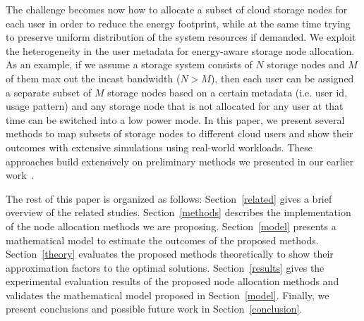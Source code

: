 The challenge becomes now how to allocate a subset of cloud storage nodes for each user in order to reduce 
the energy footprint, while at the same time trying to preserve uniform distribution of the system resources if
demanded. We exploit the heterogeneity in the user metadata for energy-aware storage node allocation. As an
example, if we assume a storage system consists of $N$ storage nodes and $M$ of them
max out the incast bandwidth ($N > M$), then each user can be assigned a separate subset of $M$ storage
nodes based on a certain metadata (i.e. user id, usage pattern) and any storage node that is not allocated
for any user at that time can be switched into a low power mode. In this paper, we present several methods
to map subsets of storage nodes to different cloud users and show their outcomes with extensive simulations
using real-world workloads. These approaches build extensively on preliminary methods we presented in our
earlier work~\cite{6322247}.

The rest of this paper is organized as follows: 
Section~\ref{related} gives a brief overview of the related studies. 
Section~\ref{methods} describes the implementation of the node allocation methods we are proposing.
Section~\ref{model} presents a mathematical model to estimate the outcomes of the proposed methods.
Section~\ref{theory} evaluates the proposed methods theoretically to show their approximation factors
to the optimal solutions.
Section~\ref{results} gives the experimental evaluation results of the proposed node allocation methods
and validates the mathematical model proposed in Section~\ref{model}.
Finally, we present conclusions and possible future work in Section~\ref{conclusion}.
